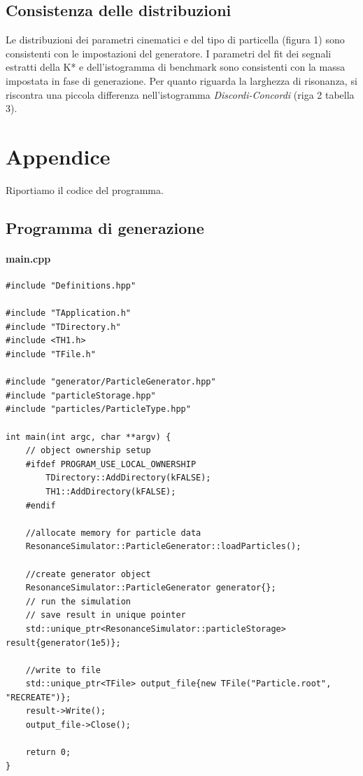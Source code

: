 \documentclass[12pt, a4paper]{article}
\begin{document}
\subsection{Consistenza delle distribuzioni}
Le distribuzioni dei parametri cinematici e del tipo di particella (figura 1) sono consistenti con le impostazioni del generatore. 
I parametri del fit dei segnali estratti della K* e dell'istogramma di benchmark sono consistenti con la massa impostata in fase di generazione. Per quanto riguarda la larghezza di risonanza, si riscontra una piccola differenza nell'istogramma \textit{Discordi-Concordi} (riga 2 tabella 3).


\section{Appendice}

Riportiamo il codice del programma.

\subsection{Programma di generazione}

\paragraph{main.cpp}

\begin{verbatim}
#include "Definitions.hpp"

#include "TApplication.h"
#include "TDirectory.h"
#include <TH1.h>
#include "TFile.h"

#include "generator/ParticleGenerator.hpp"
#include "particleStorage.hpp"
#include "particles/ParticleType.hpp"

int main(int argc, char **argv) {
    // object ownership setup
    #ifdef PROGRAM_USE_LOCAL_OWNERSHIP
        TDirectory::AddDirectory(kFALSE);
        TH1::AddDirectory(kFALSE);
    #endif

    //allocate memory for particle data
    ResonanceSimulator::ParticleGenerator::loadParticles();

    //create generator object
    ResonanceSimulator::ParticleGenerator generator{};
    // run the simulation
    // save result in unique pointer
    std::unique_ptr<ResonanceSimulator::particleStorage> result{generator(1e5)};

    //write to file
    std::unique_ptr<TFile> output_file{new TFile("Particle.root", "RECREATE")};
    result->Write();
    output_file->Close();

    return 0;
}
\end{verbatim}
\end{document}
